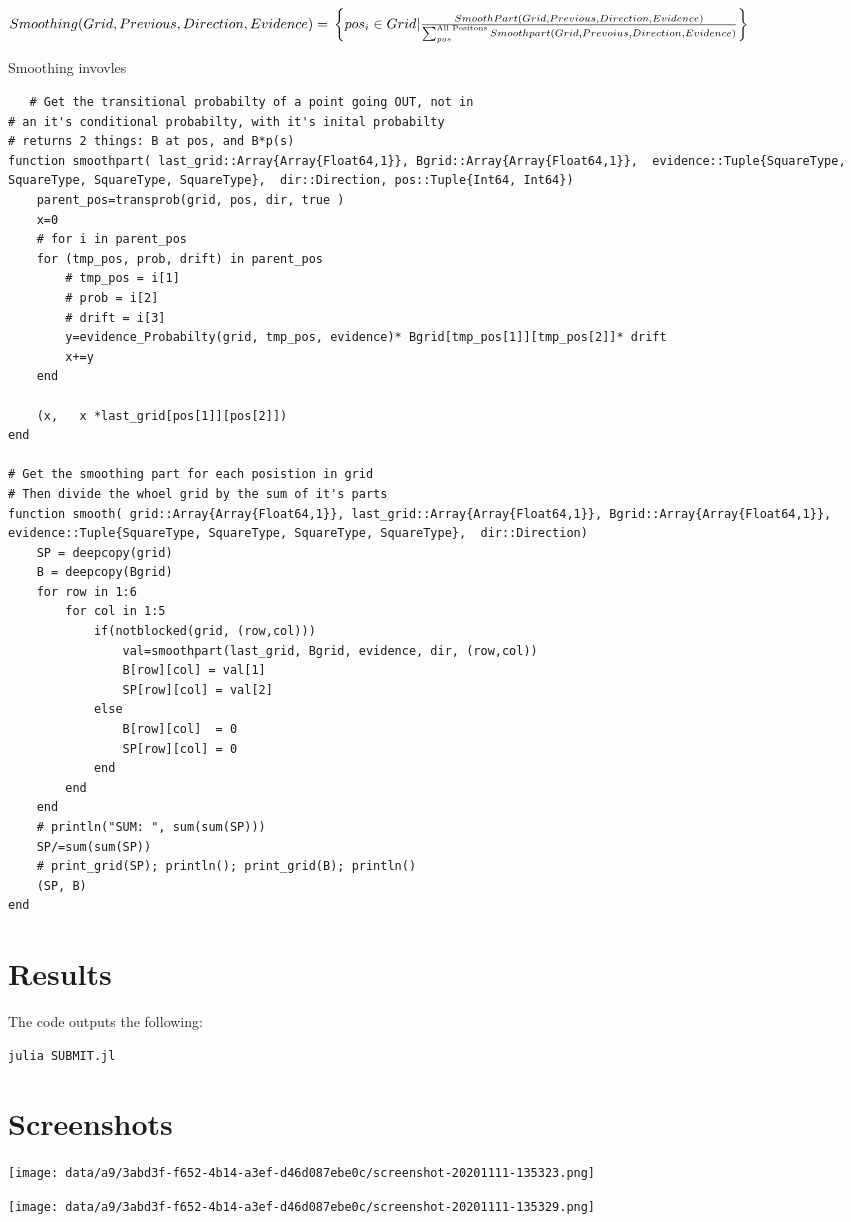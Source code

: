 \documentclass[11pt]{article}
\begin{document}
    \begin{math}
    Smoothing(Grid, Previous, Direction,Evidence) = \\
  \left\{pos_i \in Grid | \frac{SmoothPart(Grid, Previous,Direction, Evidence)}{\sum^{\text{All Positons}}_{pos} Smoothpart(Grid, Prevoius, Direction,Evidence)}  \right \}
\end{math}



Smoothing invovles

\begin{verbatim}
   # Get the transitional probabilty of a point going OUT, not in
# an it's conditional probabilty, with it's inital probabilty
# returns 2 things: B at pos, and B*p(s)
function smoothpart( last_grid::Array{Array{Float64,1}}, Bgrid::Array{Array{Float64,1}},  evidence::Tuple{SquareType, SquareType, SquareType, SquareType},  dir::Direction, pos::Tuple{Int64, Int64})
	parent_pos=transprob(grid, pos, dir, true )
	x=0
	# for i in parent_pos
	for (tmp_pos, prob, drift) in parent_pos
		# tmp_pos = i[1]
		# prob = i[2]
		# drift = i[3]
		y=evidence_Probabilty(grid, tmp_pos, evidence)* Bgrid[tmp_pos[1]][tmp_pos[2]]* drift
		x+=y
	end

	(x,   x *last_grid[pos[1]][pos[2]])
end

# Get the smoothing part for each posistion in grid
# Then divide the whoel grid by the sum of it's parts
function smooth( grid::Array{Array{Float64,1}}, last_grid::Array{Array{Float64,1}}, Bgrid::Array{Array{Float64,1}},  evidence::Tuple{SquareType, SquareType, SquareType, SquareType},  dir::Direction)
	SP = deepcopy(grid)
	B = deepcopy(Bgrid)
	for row in 1:6
		for col in 1:5
			if(notblocked(grid, (row,col)))
				val=smoothpart(last_grid, Bgrid, evidence, dir, (row,col))
				B[row][col] = val[1]
				SP[row][col] = val[2]
			else
				B[row][col]  = 0
				SP[row][col] = 0
			end
		end
	end
	# println("SUM: ", sum(sum(SP)))
	SP/=sum(sum(SP))
	# print_grid(SP); println(); print_grid(B); println()
	(SP, B)
end

\end{verbatim}
\section{Results}
\label{sec:org5b2a986}
The code outputs the following:
\begin{verbatim}
julia SUBMIT.jl
\end{verbatim}

\section{Screenshots}
\label{sec:orgcf51d23}
\begin{center}
\texttt{[image: data/a9/3abd3f-f652-4b14-a3ef-d46d087ebe0c/screenshot-20201111-135323.png]}
\end{center}
\begin{center}
\texttt{[image: data/a9/3abd3f-f652-4b14-a3ef-d46d087ebe0c/screenshot-20201111-135329.png]}
\end{center}
\end{document}

